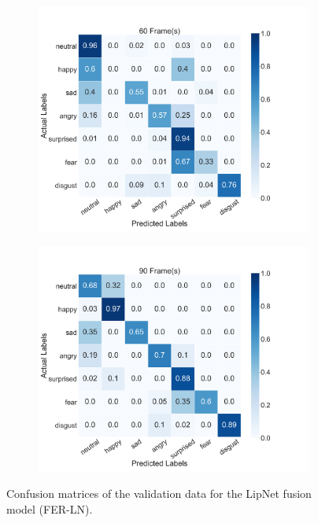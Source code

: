 \begin{figure}
\begin{subfigure}[b]{0.45\textwidth}
      \includegraphics[width=\textwidth]{res/conf_fusion_60.png}
    \end{subfigure}
    \begin{subfigure}[b]{0.45\textwidth}
      \includegraphics[width=\textwidth]{res/conf_fusion_90.png}
    \end{subfigure}
    \caption{Confusion matrices of the validation data for the LipNet fusion model (FER-LN).}
    \label{fig:lipnet_conf}
\end{figure}
